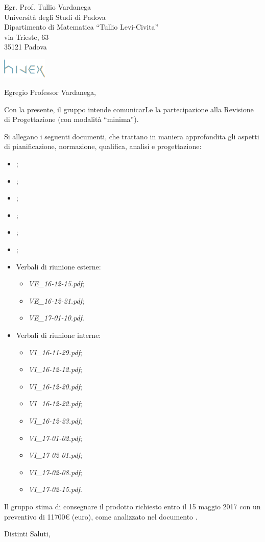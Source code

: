 \documentclass[a4paper]{letter} %
\date{Padova, \today}
\begin{document}
\begin{letter}{Egr. Prof. Tullio Vardanega\\
Università degli Studi di Padova\\
Dipartimento di Matematica “Tullio Levi-Civita”\\
via Trieste, 63\\
35121 Padova}

\includegraphics[width=80px]{../../util/hivex_logo3.png}

\opening{Egregio Professor Vardanega,}

Con la presente, il gruppo \hx{} intende comunicarLe la partecipazione alla Revisione di Progettazione (con modalità “minima”).

Si allegano i seguenti documenti, che trattano in maniera approfondita gli aspetti di pianificazione, normazione, qualifica, analisi e progettazione:
\begin{itemize}
	\item \NdP;
	\item \PdP;
	\item \PdQ;
	\item \AdR;
	\item \ST;
	\item \Glossario;
	\item Verbali di riunione esterne:
	\begin{itemize}
		\item \emph{VE\_16-12-15.pdf};
		\item \emph{VE\_16-12-21.pdf};
		\item \emph{VE\_17-01-10.pdf}.
	\end{itemize}
	\item Verbali di riunione interne:
	\begin{itemize}
		\item \emph{VI\_16-11-29.pdf};
		\item \emph{VI\_16-12-12.pdf};
		\item \emph{VI\_16-12-20.pdf};
		\item \emph{VI\_16-12-22.pdf};
		\item \emph{VI\_16-12-23.pdf};
		\item \emph{VI\_17-01-02.pdf};
		\item \emph{VI\_17-02-01.pdf};
		\item \emph{VI\_17-02-08.pdf};
		\item \emph{VI\_17-02-15.pdf}.
	\end{itemize}
\end{itemize}

Il gruppo \hx{} stima di consegnare il prodotto richiesto entro il 15 maggio 2017 con un preventivo di \num{11700}\euro{} (euro), come analizzato nel documento \PdP.

\closing{Distinti Saluti,}

\end{letter}
\end{document}
